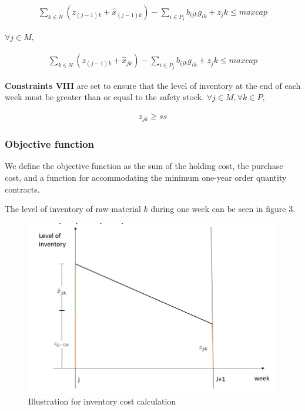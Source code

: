 \documentclass[preprint, 3p,
authoryear]{elsarticle} %
\begin{document}
\begin{align}
  \sum_{k \in N} (z_{(j-1)k} + \hat{x}_{(j-1)k}) - \sum_{i \in P_j} b_{ijk} g_{ik} + z_jk \leq maxcap
\end{align}

\(\forall j \in M,\)

\begin{align}
  \sum_{k \in N} (z_{(j-1)k} + \hat{x}_{jk}) - \sum_{i \in P_j} b_{ijk} g_{ik} + z_jk \leq maxcap
\end{align}

\textbf{Constraints VIII} are set to ensure that the level of inventory
at the end of each week must be greater than or equal to the safety
stock. \(\forall j \in M, \forall k \in P,\)

\begin{align}
  z_{jk} \geq ss
\end{align}

\hypertarget{objective-function}{%
\subsubsection{Objective function}\label{objective-function}}

We define the objective function as the sum of the holding cost, the
purchase cost, and a function for accommodating the minimum one-year
order quantity contracts.

The level of inventory of raw-material \(k\) during one week can be seen
in figure 3.

\newpage

\begin{figure}

{\centering \includegraphics[width=0.7\linewidth]{inventory} 

}

\caption{Illustration for inventory cost calculation}\label{fig:unnamed-chunk-3}
\end{figure}
\end{document}
